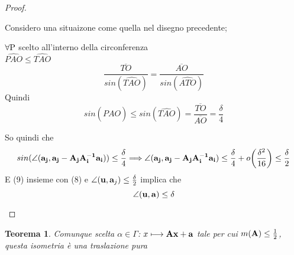 \documentclass[10pt,a4paper]{article}
\newtheorem{theorem}{Teorema}[section]
\begin{document}
\begin{proof}
\begin{itemize}
\begin{itemize}
Considero una situaizone come quella nel disegno precedente; \\ 
\begin{minipage}{0.3\textwidth}
$\forall \rm P$ scelto all'interno della circonferenza \\ $ \widehat{PAO} \leq \widehat{TAO} $ 
\[ \frac{\overline{TO}}{sin( \widehat{TAO}) } = \frac{\overline{AO}}{sin( \widehat{ATO}) } \] 
Quindi
\[ sin(\widehat{PAO}) \leq sin( \widehat{TAO})= \frac{\overline{TO}}{\overline{AO}} = \frac{\delta}{4}\]
\end{minipage} \hfill
\begin{minipage}{0.6\textwidth}
\end{minipage}

So quindi che 
\begin{equation}
sin(\angle(\vb{a_j}, \vb{a_j- A_j A_i^{-1} a_i} ) ) \leq \frac{\delta}{4} \Longrightarrow \angle(\vb{a_j}, \vb{a_j- A_j A_i^{-1} a_i} ) \leq \frac{\delta}{4} + o \bigg( \frac{\delta^2}{16} \bigg) \leq \frac{\delta}{2}
\end{equation}
E (9) insieme con (8) e $ \angle(\vb{u}, \vb{a}_j) \leq \frac{\delta}{2}$ implica che 
\[ \angle (\vb{u, a}) \leq \delta \]

\end{itemize}

\end{itemize}

\end{proof}


\begin{theorem}
 Comunque scelta $\alpha \in \Gamma$:  $x \longmapsto \vb{Ax +a} $  tale per cui $m(\vb{A}) \leq \frac{1}{2} $, questa isometria è una traslazione pura 
\end{theorem}
\end{document}
